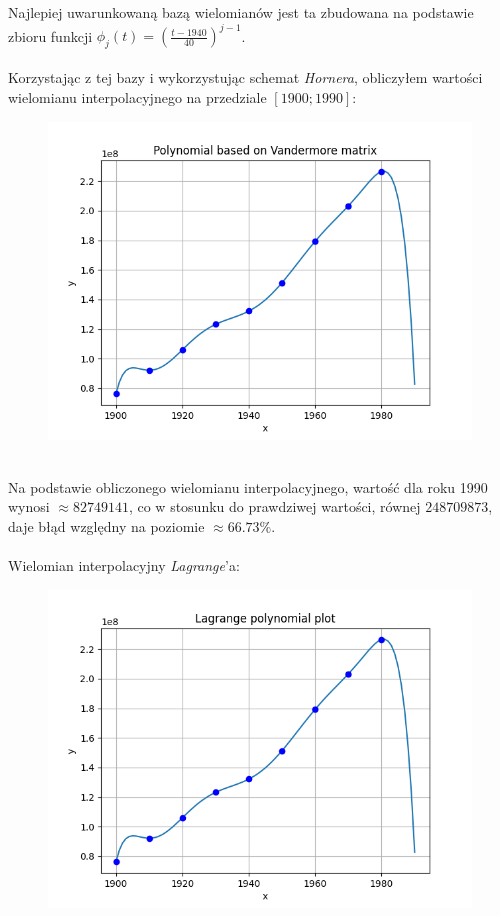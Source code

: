 \documentclass{article}
\begin{document}
Najlepiej uwarunkowaną bazą wielomianów jest
ta zbudowana na podstawie zbioru funkcji $\phi_j(t) = \left(\frac{t-1940}{40}\right)^{j-1}$.
\\\\
Korzystając z tej bazy i wykorzystując schemat \textit{Hornera}, 
obliczyłem wartości wielomianu interpolacyjnego na przedziale $[1900; 1990]$:
\begin{figure}[ht!]
  \includegraphics[width=\linewidth]{figures/vandermore.png}
\end{figure}
\\
Na podstawie obliczonego wielomianu interpolacyjnego, wartość dla roku
1990 wynosi $\approx 82 749 141$, co w stosunku do prawdziwej wartości,
równej $248 709 873$, daje błąd względny na poziomie $\approx 66.73\%$.
\\\\
Wielomian interpolacyjny \textit{Lagrange}'a:
\begin{figure}[ht!]
  \includegraphics[width=\linewidth]{figures/lagrange.png}
\end{figure}
\end{document}
